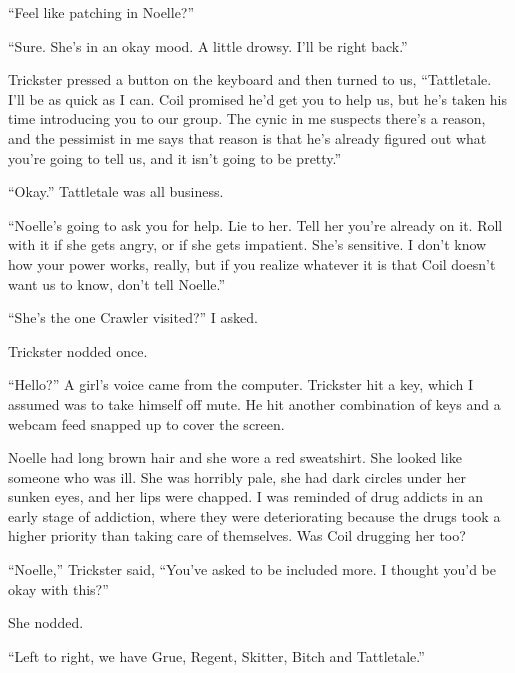 ``Feel like patching in Noelle?''



``Sure.  She's in an okay mood.  A little drowsy.  I'll be right back.''



Trickster pressed a button on the keyboard and then turned to us, ``Tattletale.  I'll be as quick as I can.  Coil promised he'd get you to help us, but he's taken his time introducing you to our group.  The cynic in me suspects there's a reason, and the pessimist in me says that reason is that he's already figured out what you're going to tell us, and it isn't going to be pretty.''



``Okay.''  Tattletale was all business.



``Noelle's going to ask you for help.  Lie to her.  Tell her you're already on it.  Roll with it if she gets angry, or if she gets impatient.  She's sensitive.  I don't know how your power works, really, but if you realize whatever it is that Coil doesn't want us to know, don't tell Noelle.''



``She's the one Crawler visited?'' I asked.



Trickster nodded once.



``Hello?'' A girl's voice came from the computer.  Trickster hit a key, which I assumed was to take himself off mute.  He hit another combination of keys and a webcam feed snapped up to cover the screen.



Noelle had long brown hair and she wore a red sweatshirt.  She looked like someone who was ill.  She was horribly pale, she had dark circles under her sunken eyes, and her lips were chapped.  I was reminded of drug addicts in an early stage of addiction, where they were deteriorating because the drugs took a higher priority than taking care of themselves.  Was Coil drugging her too?



``Noelle,'' Trickster said, ``You've asked to be included more.  I thought you'd be okay with this?''



She nodded.



``Left to right, we have Grue, Regent, Skitter, Bitch and Tattletale.''



